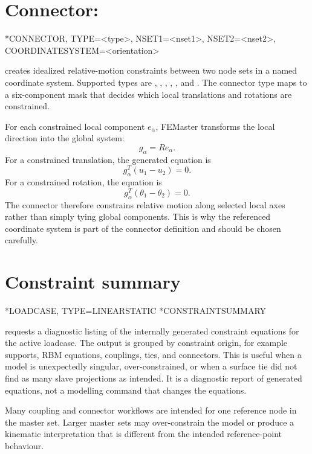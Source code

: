 \section{Connector: }

\begin{syntax}
*CONNECTOR, TYPE=<type>, NSET1=<nset1>, NSET2=<nset2>, COORDINATESYSTEM=<orientation>
\end{syntax}

 creates idealized relative-motion constraints between two node sets in a named coordinate system. Supported types are , , , , , and . The connector type maps to a six-component mask that decides which local translations and rotations are constrained.

For each constrained local component \(e_\alpha\), FEMaster transforms the local direction into the global system:
\[
g_\alpha = R e_\alpha .
\]
For a constrained translation, the generated equation is
\[
g_\alpha^T(u_1-u_2)=0 .
\]
For a constrained rotation, the equation is
\[
g_\alpha^T(\theta_1-\theta_2)=0 .
\]
The connector therefore constrains relative motion along selected local axes rather than simply tying global components. This is why the referenced coordinate system is part of the connector definition and should be chosen carefully.

\section{Constraint summary}

\begin{syntax}
*LOADCASE, TYPE=LINEARSTATIC
  *CONSTRAINTSUMMARY
\end{syntax}

 requests a diagnostic listing of the internally generated constraint equations for the active loadcase. The output is grouped by constraint origin, for example supports, RBM equations, couplings, ties, and connectors. This is useful when a model is unexpectedly singular, over-constrained, or when a surface tie did not find as many slave projections as intended. It is a diagnostic report of generated equations, not a modelling command that changes the equations.

\begin{warningbox}
Many coupling and connector workflows are intended for one reference node in the master set. Larger master sets may over-constrain the model or produce a kinematic interpretation that is different from the intended reference-point behaviour.
\end{warningbox}
